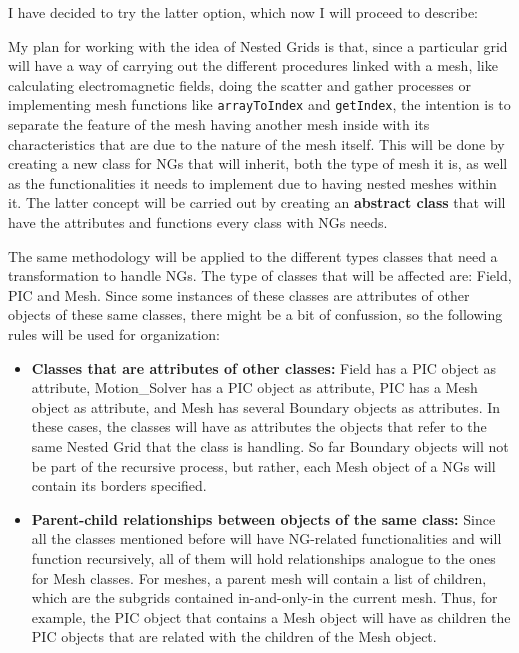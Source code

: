 \documentclass[reprint,aps]{revtex4-1}
\begin{document}
I have decided to try the latter option, which now I will proceed to describe:

My plan for working with the idea of Nested Grids is that, since a particular grid will have a way of carrying out the different procedures linked with a mesh, like calculating electromagnetic fields, doing the scatter and gather processes or implementing mesh functions like \texttt{arrayToIndex} and \texttt{getIndex}, the intention is to separate the feature of the mesh having another mesh inside with its characteristics that are due to the nature of the mesh itself. This will be done by creating a new class for NGs that will inherit, both the type of mesh it is, as well as the functionalities it needs to implement due to having nested meshes within it. The latter concept will be carried out by creating an \textbf{abstract class} that will have the attributes and functions every class with NGs needs.

The same methodology will be applied to the different types classes that need a transformation to handle NGs. The type of classes that will be affected are: Field, PIC and Mesh. Since some instances of these classes are attributes of other objects of these same classes, there might be a bit of confussion, so the following rules will be used for organization:

\begin{itemize}
\item \textbf{Classes that are attributes of other classes:} Field has a PIC object as attribute, Motion\_Solver has a PIC object as attribute, PIC has a Mesh object as attribute, and Mesh has several Boundary objects as attributes. In these cases, the classes will have as attributes the objects that refer to the same Nested Grid that the class is handling. So far Boundary objects will not be part of the recursive process, but rather, each Mesh object of a NGs will contain its borders specified.
\item \textbf{Parent-child relationships between objects of the same class:} Since all the classes mentioned before will have NG-related functionalities and will function recursively, all of them will hold relationships analogue to the ones for Mesh classes. For meshes, a parent mesh will contain a list of children, which are the subgrids contained in-and-only-in the current mesh. Thus, for example, the PIC object that contains a Mesh object will have as children the PIC objects that are related with the children of the Mesh object.
\end{itemize}
\end{document}

